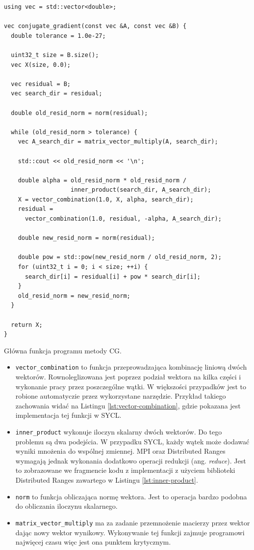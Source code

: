 \documentclass[a4paper,12pt]{book} %
\begin{document}
\begin{lstfloat}
\lstset{language=C++}
\begin{lstlisting}[frame=single]
using vec = std::vector<double>;

vec conjugate_gradient(const vec &A, const vec &B) {
  double tolerance = 1.0e-27;

  uint32_t size = B.size();
  vec X(size, 0.0);

  vec residual = B;
  vec search_dir = residual;

  double old_resid_norm = norm(residual);

  while (old_resid_norm > tolerance) {
    vec A_search_dir = matrix_vector_multiply(A, search_dir);

    std::cout << old_resid_norm << '\n';

    double alpha = old_resid_norm * old_resid_norm /
                   inner_product(search_dir, A_search_dir);
    X = vector_combination(1.0, X, alpha, search_dir);
    residual = 
	  vector_combination(1.0, residual, -alpha, A_search_dir);

    double new_resid_norm = norm(residual);

    double pow = std::pow(new_resid_norm / old_resid_norm, 2);
    for (uint32_t i = 0; i < size; ++i) {
      search_dir[i] = residual[i] + pow * search_dir[i];
    }
    old_resid_norm = new_resid_norm;
  }

  return X;
}
\end{lstlisting}
\caption{Główna funkcja programu metody CG.}
\label{lst:conjugate_gradient}
\end{lstfloat}

\begin{itemize}
\item \texttt{vector\_combination} to funkcja przeprowadzająca kombinację liniową dwóch wektorów. Rownoleglizowana jest poprzez podział wektora na kilka części i wykonanie pracy przez poszczególne wątki. W większości przypadków jest to robione automatyczie przez wykorzystane narzędzie. Przykład takiego zachowania widać na Listingu \ref{lst:vector-combination}, gdzie pokazana jest implementacja tej funkcji w SYCL.
\item \texttt{inner\_product} wykonuje iloczyn skalarny dwóch wektorów. Do tego problemu są dwa podejścia. W przypadku SYCL, każdy wątek może dodawać wyniki mnożenia do wspólnej zmiennej. MPI oraz Distributed Ranges wymagają jednak wykonania dodatkowo operacji redukcji (ang. \emph{reduce}). Jest to zobrazowane we fragmencie kodu z implementacji z użyciem biblioteki Distributed Ranges zawartego w Listingu \ref{lst:inner-product}.
\item \texttt{norm} to funkcja obliczająca normę wektora. Jest to operacja bardzo podobna do obliczania iloczynu skalarnego.
\item \texttt{matrix\_vector\_multiply} ma za zadanie przemnożenie macierzy przez wektor dając nowy wektor wynikowy. Wykonywanie tej funkcji zajmuje programowi najwięcej czasu więc jest ona punktem krytycznym. 
\end{itemize}
\end{document}

